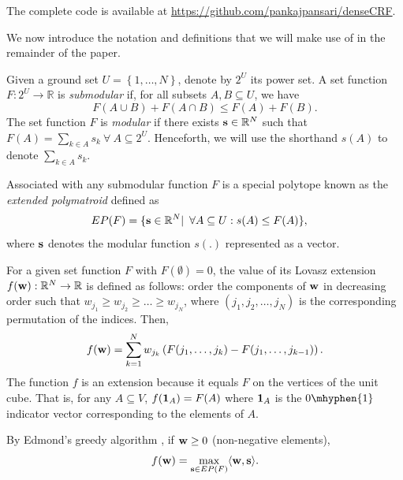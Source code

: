 The complete code is available at \url{https://github.com/pankajpansari/denseCRF}.

\label{sec:prelim}

We now introduce the notation and definitions that we will make use of in the remainder of the paper.

 Given a ground set $U = \left\{1, \dots, N \right\}$, denote by $2^U$ its power set. A set function $F: 2^U \to \mathbb{R}$ is {\it submodular} if, for all subsets $A, B \subseteq U$, we have
\begin{equation}
    F(A \cup B) + F(A \cap B) \leq F(A) + F(B).
\end{equation}
The set function $F$ is {\it modular} if there exists ${\bf s} \in \mathbb{R}^N$ such that $F(A) = \sum_{k \in A} s_k \ \forall \ A \subseteq 2^U$. Henceforth, we will use the shorthand $s(A)$ to denote ${\sum_{k \in A}} s_k$.

 Associated with any submodular function $F$ is a special polytope known as the {\it extended polymatroid} defined as
%
\begin{align}
EP(F) &= \{{\bf s} \in \mathbb{R}^N | \enskip \forall A \subseteq U: s(A) \leq F(A)\},
\label{eq:epf}
\end{align}
where $\bf s$ denotes the modular function $s(.)$ represented as a vector. 

 For a given set function $F$ with $F(\emptyset) = 0$, the value of its Lovasz extension $f({\bf w}): \mathbb{R}^N \to \mathbb{R}$ is defined as follows: order the components of $\bf w$ in decreasing order such that $w_{j_1} \geq w_{j_2} \geq \dots \geq w_{j_N}$, where $(j_1, j_2, \dots, j_N)$ is the corresponding permutation of the indices. Then,
%
\begin{align}
    f({\bf w}) = \sum_{k = 1}^{N} w_{j_k} \left(F(j_1, \dots, j_k) - F(j_1,
    \dots, j_{k - 1})\right).
    \label{eq:lovasz_def}
\end{align}
%
The function $f$ is an extension because it equals $F$ on the vertices of the
unit cube. That is, for any $A \subseteq V$, $f({\bf 1}_A) = F(A)$ where ${\bf
1}_A$ is the $0\mhyphen{1}$ indicator vector corresponding to the elements of $A$.

{\prop By Edmond's greedy algorithm \citep{edmonds1970submodular}, if ${\bf w} \geq 0$ (non-negative elements), 
\begin{equation}
    f({\bf w}) = \max_{{\bf s} \in EP(F)} \langle {\bf w}, {\bf s} \rangle.
    \label{eq:lovasz_max}
\end{equation}
\label{prop:greedy}}

